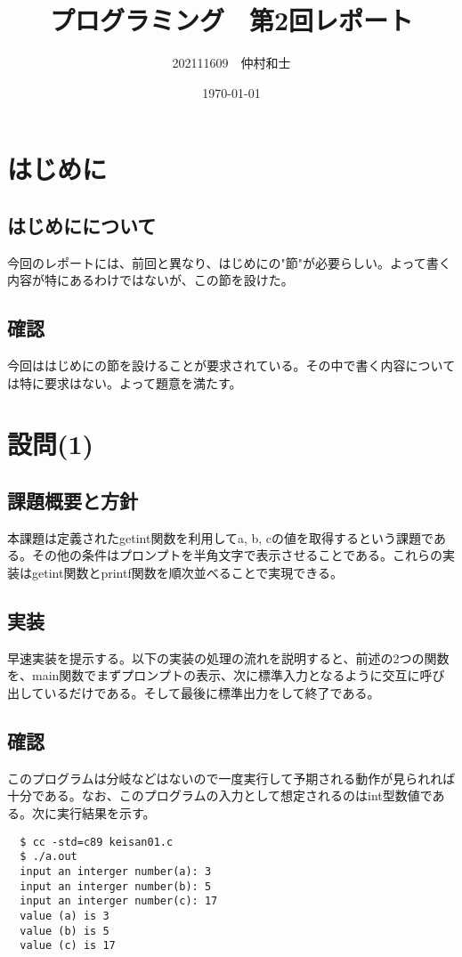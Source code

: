 \documentclass[dvipdfmx,12pt,a4j]{jarticle}
\title{プログラミング　第2回レポート}
\author{202111609　仲村和士}
\date{\today}
\begin{document}
\maketitle

\section{はじめに}
\subsection{はじめにについて}
今回のレポートには、前回と異なり、はじめにの"節"が必要らしい。よって書く内容が特にあるわけではないが、この節を設けた。

\subsection{確認}
今回ははじめにの節を設けることが要求されている。その中で書く内容については特に要求はない。よって題意を満たす。

\section{設問(1)}
\subsection{課題概要と方針}
本課題は定義されたgetint関数を利用してa, b, cの値を取得するという課題である。その他の条件はプロンプトを半角文字で表示させることである。これらの実装はgetint関数とprintf関数を順次並べることで実現できる。

\subsection{実装}
早速実装を提示する。以下の実装の処理の流れを説明すると、前述の2つの関数を、main関数でまずプロンプトの表示、次に標準入力となるように交互に呼び出しているだけである。そして最後に標準出力をして終了である。


\subsection{確認}
このプログラムは分岐などはないので一度実行して予期される動作が見られれば十分である。なお、このプログラムの入力として想定されるのはint型数値である。次に実行結果を示す。
\begin{verbatim}
  $ cc -std=c89 keisan01.c
  $ ./a.out
  input an interger number(a): 3
  input an interger number(b): 5
  input an interger number(c): 17
  value (a) is 3
  value (b) is 5
  value (c) is 17
\end{verbatim}
\end{document}
